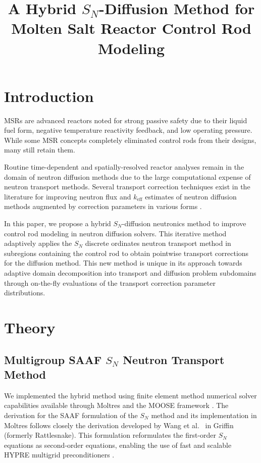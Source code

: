 \documentclass[letterpaper]{mc2025}
\title{A Hybrid $S_N$-Diffusion Method for Molten Salt Reactor Control Rod Modeling}
\begin{document}
\section{Introduction}\label{sec:1}

\glspl*{MSR} are advanced reactors noted for strong passive safety due to their liquid fuel form,
negative temperature reactivity feedback, and low operating pressure. While some \gls*{MSR} concepts
completely eliminated control rods from their designs, many still retain them.

Routine time-dependent and spatially-resolved reactor analyses remain in the domain of neutron
diffusion methods due to the large computational expense of neutron transport methods. Several
transport correction techniques exist in the literature for improving neutron flux and
$k_\text{eff}$ estimates of neutron diffusion methods augmented by correction parameters in
various forms \cite{kavenoky_sph_1978, koebke_new_1980, gross_comprehensive_2023,
tamang_multilevel_2014, stehle_hybrid_2014}.

In this paper, we propose a hybrid $S_N$-diffusion neutronics method to improve control rod
modeling in neutron diffusion solvers. This iterative method adaptively applies the $S_N$ discrete
ordinates neutron transport method in subregions containing the control rod to obtain pointwise
transport corrections for the diffusion method.
This new method is unique in its approach towards adaptive domain decomposition into transport and
diffusion problem subdomains through on-the-fly evaluations of the transport correction
parameter distributions.

\section{Theory} \label{sec:theory}

\subsection{Multigroup \Gls{SAAF} $S_N$ Neutron Transport Method} \label{sec:saaf}

We implemented the hybrid method using finite element method numerical solver capabilities available through
Moltres \cite{lindsay_introduction_2018} and the \gls*{MOOSE} framework \cite{giudicelli_30_2024}.
The derivation for the \gls*{SAAF} formulation of the $S_N$ method and its
implementation in Moltres follows closely the derivation developed by Wang et al.\
\cite{wang_diffusion_2014} in Griffin (formerly Rattlesnake). This formulation reformulates
the first-order $S_N$ equations as second-order equations, enabling the use of fast and scalable
HYPRE multigrid preconditioners \cite{hypre_hypre_2022}.
\end{document}
